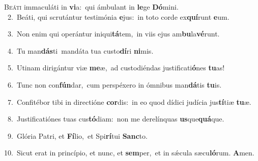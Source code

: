 \lettrine{\initial\textcolor{\initialcolor}{B}}{eáti} immaculáti in \textbf{vi}\-a:~\star qui ámbulant in \textbf{le}\-ge \textbf{Dó}\-mini.\\
{\numbfont\textcolor{\numbcolor}{~2.}}~Beáti, qui scrutántur testimónia \textbf{e}\-jus:~\star in toto corde ex\-\textbf{quí}\-runt \textbf{e}\-um.\par
{\numbfont\textcolor{\numbcolor}{~3.}}~Non enim qui operántur iniqui\-\textbf{tá}\-tem,~\star in viis ejus am\-\textbf{bu}\-la\-\textbf{vé}\-runt.\par
{\numbfont\textcolor{\numbcolor}{~4.}}~Tu man\-\textbf{dás}\-ti~\star mandáta tua custo\-\textbf{dí}\-ri \textbf{ni}\-mis.\par
{\numbfont\textcolor{\numbcolor}{~5.}}~Utinam dirigántur viæ \textbf{me}\-æ,~\star ad custodiéndas justificati\-\textbf{ó}\-nes \textbf{tu}\-as!\par
{\numbfont\textcolor{\numbcolor}{~6.}}~Tunc non con\-\textbf{fún}\-dar,~\star cum perspéxero in ómnibus man\-\textbf{dá}\-tis \textbf{tu}\-is.\par
{\numbfont\textcolor{\numbcolor}{~7.}}~Confitébor tibi in directióne \textbf{cor}\-dis:~\star in eo quod dídici judícia jus\-\textbf{tí}\-tiæ \textbf{tu}\-æ.\par
{\numbfont\textcolor{\numbcolor}{~8.}}~Justificatiónes tuas cus\-\textbf{tó}\-diam:~\star non me derelínquas \textbf{us}\-que\-\textbf{quá}\-que.\par
{\numbfont\textcolor{\numbcolor}{~9.}}~Glória Patri, et \textbf{Fí}\-lio,~\star et Spi\-\textbf{rí}\-tui \textbf{Sanc}\-to.\par
{\numbfont\textcolor{\numbcolor}{10.}}~Sicut erat in princípio, et nunc, et \textbf{sem}\-per,~\star et in sǽcula sæcu\-\textbf{ló}\-rum. \textbf{A}\-men.\par
